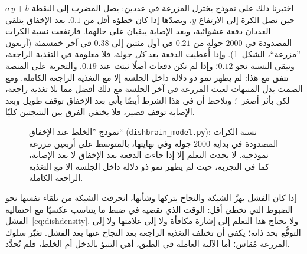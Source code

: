 اختبرنا ذلك على نموذج يختزل المزرعة في عددين: يصل المضرب إلى النقطة $a\,y+b$ حين تصل الكرة إلى الارتفاع $y$، ويصدّها إذا كان خطؤه أقل من $0.1$. بعد الإخفاق يتلقى العددان دفعة عشوائية، وبعد الإصابة يبقيان على حالهما. فارتفعت نسبة الكرات المصدودة في $2000$ جولة من $0.21$ في أول مئتين إلى $0.38$ في آخر خمسمئة (أربعون ”مزرعة“، الشكل~\ref{fig:dishmodel}). وإذا أُعطيت الدفعة بعد \emph{كل} جولة، فلا معلومة في التغذية الراجعة، وتبقى النسبة نحو $0.12$؛ وإذا لم تكن دفعات أصلًا ثبتت عند $0.19$. والتجربة على المنصة تتفق مع هذا: لم يظهر نمو ذو دلالة داخل الجلسة إلا مع التغذية الراجعة الكاملة. ومع الصمت بدل المنبهات لعبت المزرعة في آخر الجلسة مع ذلك أفضل مما بلا تغذية راجعة، لكن بأثر أصغر~\cite{Kagan2022}؛ ونلاحظ أن في هذا الشرط أيضًا يأتي بعد الإخفاق توقف طويل وبعد الإصابة توقف قصير، فلا يختفي الفرق بين النتيجتين كليًا.

\begin{figure}[t]
\centering
{}
\caption{نموذج ”الخلط عند الإخفاق“ (\foreignlanguage{english}{\texttt{dishbrain\_model.py}}): نسبة الكرات المصدودة في بداية $2000$ جولة وفي نهايتها، بالمتوسط على أربعين مزرعة نموذجية. لا يحدث التعلم إلا إذا جاءت الدفعة بعد الإخفاق لا بعد الإصابة، كما في التجربة، حيث لم يظهر نمو ذو دلالة داخل الجلسة إلا مع التغذية الراجعة الكاملة.}
\label{fig:dishmodel}
\end{figure}

\begin{keyblock}
\begin{proposition}
\label{prop:dishscramble}
إذا كان الفشل يهزّ الشبكة والنجاح يتركها وشأنها، انجرفت الشبكة من تلقاء نفسها نحو الضبوط التي تخطئ أقل: الوقت الذي تقضيه في ضبط ما يتناسب عكسيًا مع احتمالية الفشل~\eqref{eq:dishdensity}. ولا يحتاج هذا التعلم إلى إشارة مكافأة ولا إلى علامتها ولا إلى التوقُّع بحد ذاته؛ يكفي أن تختلف التغذية الراجعة بعد النجاح عنها بعد الفشل. تغيّر سلوك المزرعة مُقاس؛ أما الآلية العاملة في الطبق، أهي التنبؤ بالدخل أم الخلط، فلم تُحدَّد.
\end{proposition}
\end{keyblock}

